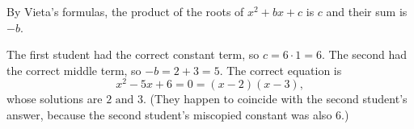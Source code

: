 By Vieta's formulas, the product of the roots of $x^2+bx+c$ is $c$ and their sum is $-b$.

The first student had the correct constant term, so $c=6\cdot1=6$. The second had the correct middle term, so $-b=2+3=5$. The correct equation is
\[x^2-5x+6=0=(x-2)(x-3),\]
whose solutions are $\boxed{2\text{ and }3}$. (They happen to coincide with the second student's answer, because the second student's miscopied constant was also $6$.)
